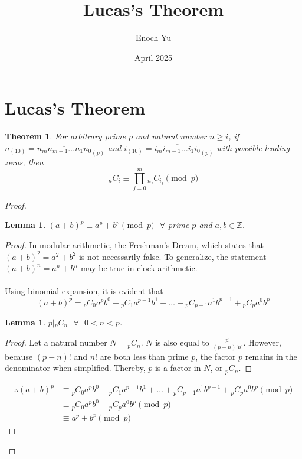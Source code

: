 \documentclass{article}
\title{Lucas's Theorem}
\author{Enoch Yu}
\date{April 2025}
\newtheorem*{theorem*}{Theorem}
\newtheorem{lemma}[theorem]{Lemma}
\newtheorem{sublemma}{Lemma}[section]
\begin{document}
\section*{Lucas's Theorem}
\begin{theorem*}
    For arbitrary prime $p$ and natural number $n \ge i$, if $n_{(10)}=\overline{n_mn_{m-1}\dots n_1n_0}_{(p)}$ and $i_{(10)}=\overline{i_mi_{m-1}\dots i_1i_0}_{(p)}$ with possible leading zeros, then 
    \[
    _nC_i \equiv \prod_{j=0}^{m} {}_{n_j}C_{i_j} \pmod{p}
    \]
\end{theorem*}

\begin{proof}

\begin{lemma}
        $(a+b)^p \equiv a^p+b^p \pmod{p} \text{ }\forall$ prime $p$ and $a,b\in\mathbb{Z}$.
\end{lemma}
\begin{proof}
    In modular arithmetic, the Freshman's Dream, which states that $(a+b)^2=a^2+b^2$ is not necessarily false. To generalize, the statement $(a+b)^n=a^n+b^n$ may be true in clock arithmetic.
    \\\\
    Using binomial expansion, it is evident that
    \[
    (a+b)^p={}_{p}C_{0}a^{p}b^{0}+{}_{p}C_{1}a^{p-1}b^{1}+\dots+{}_{p}C_{p-1}a^{1}b^{p-1}+{}_{p}C_{p}a^{0}b^{p}
    \]

\begin{sublemma}
    $p|{}_pC_n \text{ }\forall\text{ }0<n<p$.
\end{sublemma}
\begin{proof}
    Let a natural number $N={}_pC_n$. $N$ is also equal to $\frac{p!}{(p-n)!n!}$. However, because $(p-n)!$ and $n!$ are both less than prime $p$, the factor $p$ remains in the denominator when simplified. Thereby, $p$ is a factor in $N$, or ${}_pC_n$.
\end{proof}

\begin{align*}
    \therefore (a+b)^p &\equiv {}_{p}C_{0}a^{p}b^{0}+{}_{p}C_{1}a^{p-1}b^{1}+\dots+{}_{p}C_{p-1}a^{1}b^{p-1}+{}_{p}C_{p}a^{0}b^{p} \pmod{p} \\
    &\equiv {}_{p}C_{0}a^{p}b^{0}+{}_{p}C_{p}a^{0}b^{p} \pmod{p} \\
     &\equiv a^p+b^p \pmod{p}
\end{align*}
\end{proof}


\end{proof}
\end{document}
